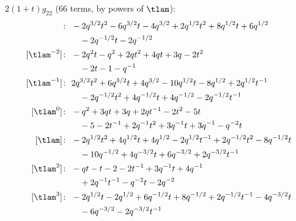 $2(1 + t) g_{22}$ (66 terms, by powers of $\tlam$):
\begin{align*}
[\tlam^{-3}]\colon\ & -2 q^{3/2} t^{2} -6 q^{3/2} t -4 q^{3/2} +2 q^{1/2} t^{2} +8 q^{1/2} t +6 q^{1/2} \\
& \quad -2 q^{-1/2} t -2 q^{-1/2} \\
[\tlam^{-2}]\colon\ & -2 q^{2} t -q^{2} +2 q t^{2} +4 q t +3 q -2 t^{2} \\
& \quad -2 t -1 -q^{-1} \\
[\tlam^{-1}]\colon\ & 2 q^{3/2} t^{2} +6 q^{3/2} t +4 q^{3/2} -10 q^{1/2} t -8 q^{1/2} +2 q^{1/2} t^{-1} \\
& \quad -2 q^{-1/2} t^{2} +4 q^{-1/2} t +4 q^{-1/2} -2 q^{-1/2} t^{-1} \\
[\tlam^{0}]\colon\ & -q^{2} +3 q t +3 q +2 q t^{-1} -2 t^{2} -5 t \\
& \quad -5 -2 t^{-1} +2 q^{-1} t^{2} +3 q^{-1} t +3 q^{-1} -q^{-2} t \\
[\tlam]\colon\ & -2 q^{1/2} t^{2} +4 q^{1/2} t +4 q^{1/2} -2 q^{1/2} t^{-1} +2 q^{-1/2} t^{2} -8 q^{-1/2} t \\
& \quad -10 q^{-1/2} +4 q^{-3/2} t +6 q^{-3/2} +2 q^{-3/2} t^{-1} \\
[\tlam^{2}]\colon\ & -q t -t -2 -2 t^{-1} +3 q^{-1} t +4 q^{-1} \\
& \quad +2 q^{-1} t^{-1} -q^{-2} t -2 q^{-2} \\
[\tlam^{3}]\colon\ & -2 q^{1/2} t -2 q^{1/2} +6 q^{-1/2} t +8 q^{-1/2} +2 q^{-1/2} t^{-1} -4 q^{-3/2} t \\
& \quad -6 q^{-3/2} -2 q^{-3/2} t^{-1}
\end{align*}

